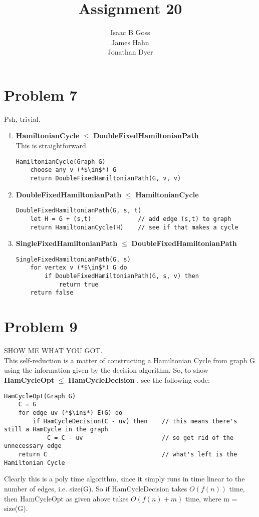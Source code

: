 \documentclass{article}
\author{Isaac B Goss\\ James Hahn\\ Jonathan Dyer}
\title{Assignment 20}
\providecommand{\prob}[1]{\section*{Problem #1}}
\providecommand{\reducible}[2]{
  \textbf{#1} $\leq$ \textbf{#2}
}
\begin{document}
\maketitle
\prob{7}
Psh, trivial.
\begin{enumerate}
  \item \reducible{HamiltonianCycle}{DoubleFixedHamiltonianPath} \\
        This is straightforward.
  \begin{lstlisting}
HamiltonianCycle(Graph G)
    choose any v (*$\in$*) G
    return DoubleFixedHamiltonianPath(G, v, v)
  \end{lstlisting}

  \item \reducible{DoubleFixedHamiltonianPath}{HamiltonianCycle}
  \begin{lstlisting}
DoubleFixedHamiltonianPath(G, s, t)
    let H = G + (s,t)             // add edge (s,t) to graph
    return HamiltonianCycle(H)    // see if that makes a cycle
  \end{lstlisting}

  \item \reducible{SingleFixedHamiltonianPath}{DoubleFixedHamiltonianPath}
  \begin{lstlisting}
SingleFixedHamiltonianPath(G, s)
    for vertex v (*$\in$*) G do
        if DoubleFixedHamiltonianPath(G, s, v) then
            return true
    return false
  \end{lstlisting}

\end{enumerate}

\prob{9}
SHOW ME WHAT YOU GOT.\\
This self-reduction is a matter of constructing a Hamiltonian Cycle from graph G using the information given by the decision algorithm.
So, to show \reducible{HamCycleOpt}{HamCycleDecision}, see the following code:
\begin{lstlisting}
HamCycleOpt(Graph G)
    C = G
    for edge uv (*$\in$*) E(G) do
        if HamCycleDecision(C - uv) then    // this means there's still a HamCycle in the graph
            C = C - uv                      // so get rid of the unnecessary edge
    return C                                // what's left is the Hamiltonian Cycle
\end{lstlisting}
Clearly this is a poly time algorithm, since it simply runs in time linear to the number of edges, i.e. size(G). So if HamCycleDecision takes $O(f(n))$ time, then HamCycleOpt as given above takes $O(f(n) + m)$ time, where m = size(G).
\end{document}
